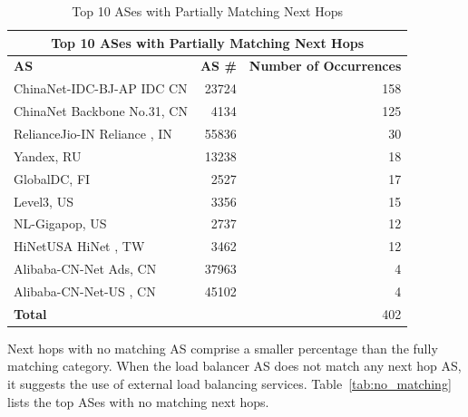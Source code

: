 \documentclass[12pt]{cwru_thesis}
\begin{document}
\begin{table}[h!]
    \centering
    \begin{tabular}{|l|r|r|}
        \hline
        \multicolumn{3}{|c|}{\textbf{Top 10 ASes with Partially Matching Next Hops}} \\
        \hline
        \textbf{AS} & \textbf{AS \#} & \textbf{Number of Occurrences} \\
        \hline
        ChinaNet-IDC-BJ-AP IDC CN & 23724 & 158 \\
        ChinaNet Backbone No.31, CN & 4134 & 125 \\
        RelianceJio-IN Reliance , IN & 55836 & 30 \\
        Yandex, RU & 13238 & 18 \\
        GlobalDC, FI & 2527 & 17 \\
        Level3, US & 3356 & 15 \\
        NL-Gigapop, US & 2737 & 12 \\
        HiNetUSA HiNet , TW & 3462 & 12 \\
        Alibaba-CN-Net Ads, CN & 37963 & 4 \\
        Alibaba-CN-Net-US , CN & 45102 & 4 \\
        \hline
        \textbf{Total} & & 402 \\
        \hline
    \end{tabular}
    \caption{Top 10 ASes with Partially Matching Next Hops}
    \label{tab:partially_matching}
\end{table}


Next hops with no matching AS comprise a smaller percentage than the fully matching category. When the load balancer AS does not match any next hop AS, it suggests the use of external load balancing services. Table~\ref{tab:no_matching} lists the top ASes with no matching next hops.
\end{document}
